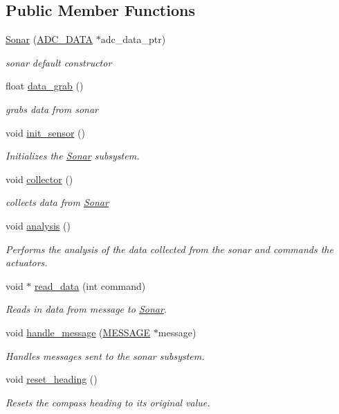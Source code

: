 \subsection*{Public Member Functions}
\begin{DoxyCompactItemize}
\item 
\hyperlink{classSonar_a152453d934da6d4e576f9d59dc80b762}{Sonar} (\hyperlink{struct__ADC__DATA}{A\-D\-C\-\_\-\-D\-A\-T\-A} $\ast$adc\-\_\-data\-\_\-ptr)
\begin{DoxyCompactList}\small\item\em sonar default constructor \end{DoxyCompactList}\item 
float \hyperlink{classSonar_aa4e807cbed15ce1d46ddcef05b6b59fb}{data\-\_\-grab} ()
\begin{DoxyCompactList}\small\item\em grabs data from sonar \end{DoxyCompactList}\item 
void \hyperlink{classSonar_af91d04cbc441084ba608a49c2be88d5b}{init\-\_\-sensor} ()
\begin{DoxyCompactList}\small\item\em Initializes the \hyperlink{classSonar}{Sonar} subsystem. \end{DoxyCompactList}\item 
void \hyperlink{classSonar_a38b0e409082be17e7098b2e471bab4a8}{collector} ()
\begin{DoxyCompactList}\small\item\em collects data from \hyperlink{classSonar}{Sonar} \end{DoxyCompactList}\item 
void \hyperlink{classSonar_a11a32c64528f8e69fdde4722f3b3bc7b}{analysis} ()
\begin{DoxyCompactList}\small\item\em Performs the analysis of the data collected from the sonar and commands the actuators. \end{DoxyCompactList}\item 
void $\ast$ \hyperlink{classSonar_a54f55470741873f333ad8af8a98affc8}{read\-\_\-data} (int command)
\begin{DoxyCompactList}\small\item\em Reads in data from message to \hyperlink{classSonar}{Sonar}. \end{DoxyCompactList}\item 
void \hyperlink{classSonar_a5f9b0f57b5a05b03b0dcb5ab830592ff}{handle\-\_\-message} (\hyperlink{SUBSYS__COMMANDS_8h_ad814416fc1a8c675bea2687d96088a8f}{M\-E\-S\-S\-A\-G\-E} $\ast$message)
\begin{DoxyCompactList}\small\item\em Handles messages sent to the sonar subsystem. \end{DoxyCompactList}\item 
void \hyperlink{classSonar_a9648cfd15b2f2ef88c2094b0dfd19a6c}{reset\-\_\-heading} ()
\begin{DoxyCompactList}\small\item\em Resets the compass heading to its original value. \end{DoxyCompactList}\end{DoxyCompactItemize}
